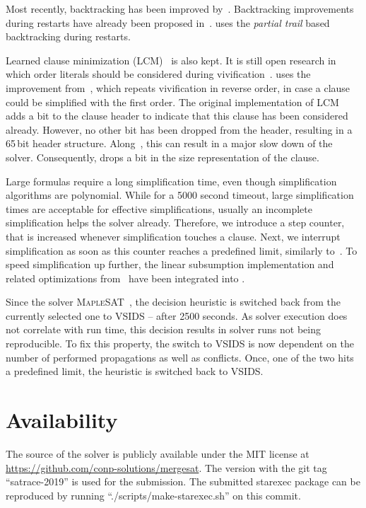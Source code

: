 \documentclass[conference]{IEEEtran}
\begin{document}
Most recently, backtracking has been improved by~\cite{10.1007/978-3-319-94144-8_7}. Backtracking improvements during restarts have already been proposed in~\cite{10.1007/978-3-642-21581-0_18}.
\mergesat uses the \emph{partial trail} based backtracking during restarts.

Learned clause minimization (LCM)~\cite{ijcai2017-98} is also kept. It is still open research in which order literals should be considered during vivification~\cite{DBLP:conf/ecai/PietteHS08}.
\mergesat uses the improvement from~\cite{riss71}, which repeats vivification in reverse order, in case a clause could be simplified with the first order.
The original implementation of LCM adds a bit to the clause header to indicate that this clause has been considered already.
However, no other bit has been dropped from the header, resulting in a 65\,bit header structure.
Along~\cite{HolldoblerMS:2010}, this can result in a major slow down of the solver.
Consequently, \mergesat drops a bit in the size representation of the clause.

Large formulas require a long simplification time, even though simplification algorithms are polynomial.
While for a 5000 second timeout, large simplification times are acceptable for effective simplifications, usually an incomplete simplification helps the solver already.
Therefore, we introduce a step counter, that is increased whenever simplification touches a clause.
Next, we interrupt simplification as soon as this counter reaches a predefined limit, similarly to~\cite{precosat}.
To speed simplification up further, the linear subsumption implementation and related optimizations from~\cite{POS-18:Tuning_Parallel_SAT_Solvers} have been integrated into \mergesat.

Since the solver \textsc{MapleSAT}~\cite{MapleSAT}, the decision heuristic is switched back from the currently selected one to VSIDS -- after 2500 seconds.
As solver execution does not correlate with run time, this decision results in solver runs not being reproducible.
To fix this property, the switch to VSIDS is now dependent on the number of performed propagations as well as conflicts.
Once, one of the two hits a predefined limit, the heuristic is switched back to VSIDS.

\section{Availability}

The source of the solver is publicly available under the MIT license at \url{https://github.com/conp-solutions/mergesat}.
The version with the git tag ``satrace-2019'' is used for the submission.
The submitted starexec package can be reproduced by running ``./scripts/make-starexec.sh'' on this commit.
\end{document}
